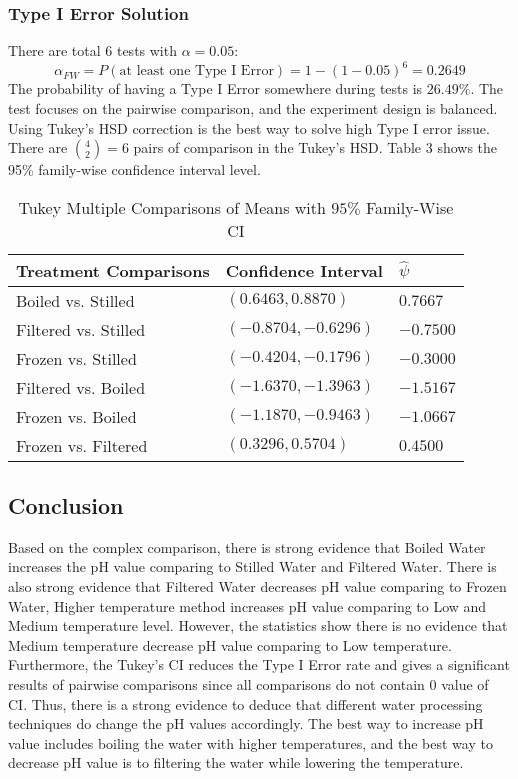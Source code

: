 \documentclass[12pt,]{article}
\begin{document}
\hypertarget{type-i-error-solution}{%
\subsubsection{Type I Error Solution}\label{type-i-error-solution}}

There are total 6 tests with \(\alpha=0.05\):
\[\alpha_{FW}=P(\text{at least one Type I Error})=1-(1-0.05)^6=0.2649\]
The probability of having a Type I Error somewhere during tests is
\(26.49\%\). The test focuses on the pairwise comparison, and the
experiment design is balanced. Using Tukey's HSD correction is the best
way to solve high Type I error issue. There are \({4\choose 2}=6\) pairs
of comparison in the Tukey's HSD. Table 3 shows the 95\% family-wise
confidence interval level.

\begin{table}[H]
\caption{Tukey Multiple Comparisons of Means with $95\%$ Family-Wise CI}
\vspace{4pt}
\centering
\begin{tabular}{ |p{5cm}||p{4cm}|p{4cm}|  }
 \hline
 Treatment Comparisons & Confidence Interval&$\hat{\psi}$\\
 \hline
 Boiled vs. Stilled & $(0.6463,0.8870)$ &$0.7667$\\
 Filtered vs. Stilled & $(-0.8704,-0.6296)$ & $-0.7500$\\
 Frozen vs. Stilled & $(-0.4204,-0.1796)$ & $-0.3000$\\
 Filtered vs. Boiled & $(-1.6370,-1.3963)$ & $-1.5167$\\
 Frozen vs. Boiled & $(-1.1870,-0.9463)$ & $-1.0667$\\
 Frozen vs. Filtered & $(0.3296,0.5704)$ & $0.4500$\\
 \hline
\end{tabular}
\end{table}

\hypertarget{conclusion}{%
\subsection{Conclusion}\label{conclusion}}

Based on the complex comparison, there is strong evidence that Boiled
Water increases the pH value comparing to Stilled Water and Filtered
Water. There is also strong evidence that Filtered Water decreases pH
value comparing to Frozen Water, Higher temperature method increases pH
value comparing to Low and Medium temperature level. However, the
statistics show there is no evidence that Medium temperature decrease pH
value comparing to Low temperature. Furthermore, the Tukey's CI reduces
the Type I Error rate and gives a significant results of pairwise
comparisons since all comparisons do not contain \(0\) value of CI.
Thus, there is a strong evidence to deduce that different water
processing techniques do change the pH values accordingly. The best way
to increase pH value includes boiling the water with higher
temperatures, and the best way to decrease pH value is to filtering the
water while lowering the temperature.
\end{document}
